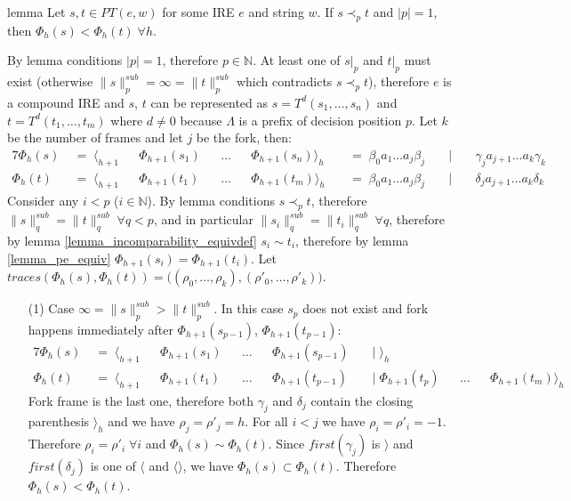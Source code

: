 \documentclass[AMA,STIX1COL]{WileyNJD-v2}
\newcommand{\Xl}{\langle}
\newcommand{\Xr}{\rangle}
\newcommand{\Xm}{\langle\!\rangle}
\newcommand{\YN}{\mathbb{N}}
\newcommand{\PT}{PT}
\newcommand{\snorm}[2]{\|{#1}\|^{sub}_{#2}}
\begin{document}
\begin{theoremEnd}{lemma}
    \label{lemma_pe_less_1}
    Let $s, t \in \PT(e, w)$ for some IRE $e$ and string $w$.
    If $s \prec_p t$ and $|p| = 1$, then $\Phi_{h}(s) < \Phi_{h}(t) \; \forall h$.
\end{theoremEnd}
\begin{proofEnd}
    By lemma conditions $|p| = 1$, therefore $p \in \YN$.
    At least one of $s|_p$ and $t|_p$ must exist (otherwise $\snorm{s}{p} = \infty = \snorm{t}{p}$ which contradicts $s \prec_p t$),
    therefore $e$ is a compound IRE and $s$, $t$ can be represented as
    $s = T^{d} (s_1, \dots, s_n)$ and
    $t = T^{d} (t_1, \dots, t_m)$
    where $d \neq 0$ because $\Lambda$ is a prefix of decision position $p$.
    Let $k$ be the number of frames and let $j$ be the fork, then:
    \begin{alignat*}{7}
        \Phi_{h}(s) &\;=\; \Xl_{h+1} &&\Phi_{h+1}(s_1) &&\dots &&\Phi_{h+1}(s_n) \Xr_h
            &&\;=\; \beta_0 a_1 \dots a_j \beta_j &&\;\big|\; && \gamma_j a_{j + 1} \dots a_k \gamma_k \\[-0.5em]
        \Phi_{h}(t) &\;=\; \Xl_{h+1} &&\Phi_{h+1}(t_1) &&\dots &&\Phi_{h+1}(t_m) \Xr_h
            &&\;=\; \beta_0 a_1 \dots a_j \beta_j &&\;\big|\; && \delta_j a_{j + 1} \dots a_k \delta_k
    \end{alignat*}
%
    Consider any $i < p$ ($i \in \YN$).
    By lemma conditions $s \prec_p t$, therefore $\snorm{s}{q} = \snorm{t}{q} \;\forall q < p$, and
    in particular $\snorm{s_i}{q} = \snorm{t_i}{q} \;\forall q$, therefore
    by lemma \ref{lemma_incomparability_equivdef} $s_i \sim t_i$,
    therefore by lemma \ref{lemma_pe_equiv} $\Phi_{h+1}(s_i) = \Phi_{h+1}(t_i)$.
    Let $traces (\Phi_{h}(s), \Phi_{h}(t)) = \big( (\rho_0, \dots, \rho_k), (\rho'_0, \dots, \rho'_k) \big)$.

    \begin{itemize}[itemsep=0.5em, topsep=0.5em]
    \item[(1)]
        Case $\infty = \snorm{s}{p} > \snorm{t}{p}$.
        In this case $s_p$ does not exist
        and fork happens immediately after $\Phi_{h+1}(s_{p-1})$, $\Phi_{h+1}(t_{p-1})$:
        \begin{alignat*}{7}
            \Phi_{h}(s) &\;=\; \Xl_{h+1} &&\Phi_{h+1}(s_1) &&\dots &&\Phi_{h+1}(s_{p-1})
                &&\;\big|\; \Xr_{h}         &&      && \\[-0.5em]
            \Phi_{h}(t) &\;=\; \Xl_{h+1} &&\Phi_{h+1}(t_1) &&\dots &&\Phi_{h+1}(t_{p-1})
                &&\;\big|\; \Phi_{h+1}(t_p) &&\dots &&\Phi_{h+1}(t_m) \Xr_{h}
        \end{alignat*}
        Fork frame is the last one,
        therefore both $\gamma_j$ and $\delta_j$ contain the closing parenthesis $\Xr_{h}$
        and we have $\rho_j = \rho'_j = h$.
        For all $i < j$ we have $\rho_i = \rho'_i = -1$.
        Therefore $\rho_i = \rho'_i \;\forall i$ and $\Phi_{h}(s) \sim \Phi_{h}(t)$.
        Since $first(\gamma_j)$ is $\Xr$ and $first(\delta_j)$ is one of $\Xl$ and $\Xm$,
        we have $\Phi_{h}(s) \subset \Phi_{h}(t)$.
        Therefore $\Phi_{h}(s) < \Phi_{h}(t)$.


\end{itemize}
\end{proofEnd}
\end{document}
